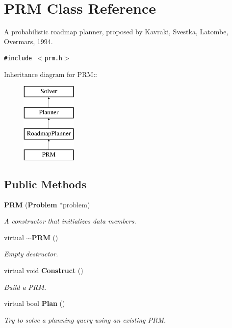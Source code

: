 \section{PRM  Class Reference}
\label{class_PRM}
A probabilistic roadmap planner, proposed by Kavraki, Svestka, Latombe, Overmars, 1994. 


{\tt \#include $<$prm.h$>$}

Inheritance diagram for PRM::\begin{figure}[H]
\begin{center}
\leavevmode
\includegraphics[height=4cm]{class_PRM}
\end{center}
\end{figure}
\subsection*{Public Methods}
\begin{CompactItemize}
\item 
{\bf PRM} ({\bf Problem} $\ast$problem)
\begin{CompactList}\small\item\em A constructor that initializes data members.\item\end{CompactList}\item 
virtual {\bf $\sim$PRM} ()
\begin{CompactList}\small\item\em Empty destructor.\item\end{CompactList}\item 
virtual void {\bf Construct} ()
\begin{CompactList}\small\item\em Build a PRM.\item\end{CompactList}\item 
virtual bool {\bf Plan} ()
\begin{CompactList}\small\item\em Try to solve a planning query using an existing PRM.\item\end{CompactList}\end{CompactItemize}
